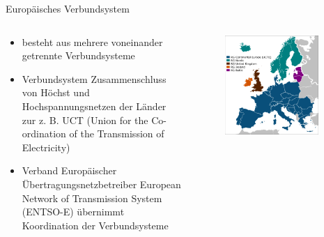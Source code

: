 \documentclass[aspectratio=1610, professionalfonts, 9pt]{beamer}
\begin{document}
{
\begin{frame}{Europäisches Verbundsystem}
\begin{columns}
\begin{column}{0.5\textwidth}
\begin{itemize}
  \item besteht aus mehrere voneinander getrennte Verbundsysteme
\item Verbundsystem
Zusammenschluss von Höchst und Hochspannungsnetzen der Länder zur z. B. UCT  (Union for the Co-ordination of the Transmission of Electricity)
  \item Verband Europäischer Übertragungsnetzbetreiber
   European Network of Transmission System (ENTSO-E) übernimmt Koordination
der Verbundsysteme
\end{itemize}
\end{column}
\begin{column}{0.5\textwidth}
    \begin{figure}
\includegraphics[width=0.9\textwidth]{images/Euronetz.png}
\end{figure}
\end{column}
\end{columns}
\end{frame}
}
\end{document}
